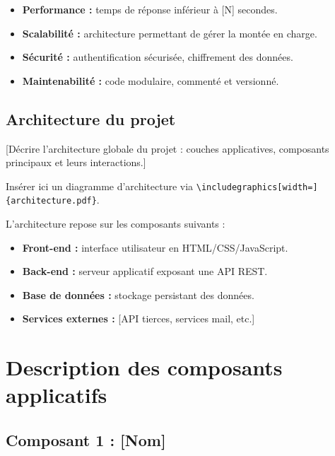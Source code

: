 \documentclass[12pt, a4paper]{article}
\begin{document}
\begin{itemize}
  \item \textbf{Performance :} temps de réponse inférieur à [N] secondes.
  \item \textbf{Scalabilité :} architecture permettant de gérer la montée en charge.
  \item \textbf{Sécurité :} authentification sécurisée, chiffrement des données.
  \item \textbf{Maintenabilité :} code modulaire, commenté et versionné.
\end{itemize}

\subsection{Architecture du projet}

[Décrire l'architecture globale du projet : couches applicatives, composants
principaux et leurs interactions.]

\begin{remarque}
  Insérer ici un diagramme d'architecture via
  \texttt{\textbackslash includegraphics[width=\textwidth]\{architecture.pdf\}}.
\end{remarque}

L'architecture repose sur les composants suivants :
\begin{itemize}
  \item \textbf{Front-end :} interface utilisateur en HTML/CSS/JavaScript.
  \item \textbf{Back-end :} serveur applicatif exposant une API REST.
  \item \textbf{Base de données :} stockage persistant des données.
  \item \textbf{Services externes :} [API tierces, services mail, etc.]
\end{itemize}

\section{Description des composants applicatifs}

\subsection{Composant 1 : [Nom]}
\end{document}

